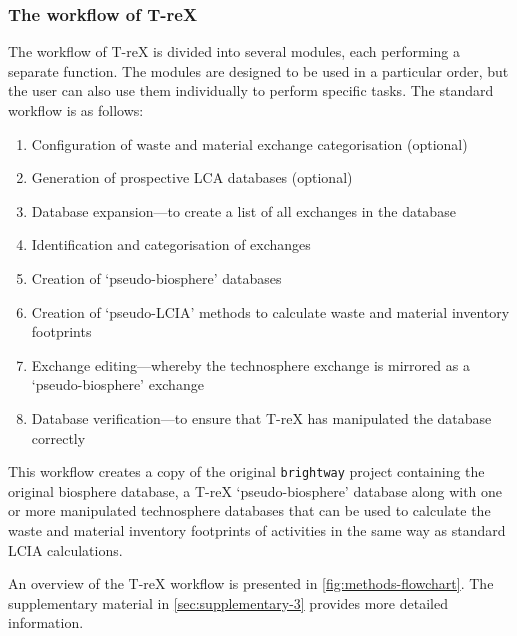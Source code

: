 \documentclass[a4paper,fleqn]{cas-dc}
\begin{document}
\subsubsection{The workflow of T-reX}

The workflow of T-reX is divided into several modules, each performing a
separate function. The modules are designed to be used in a particular order,
but the user can also use them individually to perform specific tasks. The
standard workflow is as follows:

\begin{enumerate}
	\item Configuration of waste and material exchange categorisation (optional)
	\item Generation of prospective LCA databases (optional)
	\item Database expansion---to create a list of all exchanges in the database
	\item Identification and categorisation of exchanges
	\item Creation of `pseudo-biosphere' databases
	\item Creation of `pseudo-LCIA' methods to calculate waste and material inventory
	      footprints
	\item Exchange editing---whereby the technosphere exchange is mirrored as a
	      `pseudo-biosphere' exchange
	\item Database verification---to ensure that T-reX has manipulated the database
	      correctly
\end{enumerate}

This workflow creates a copy of the original \texttt{brightway} project
containing the original biosphere database, a T-reX `pseudo-biosphere' database
along with one or more manipulated technosphere databases that can be used to
calculate the waste and material inventory footprints of activities in the same
way as standard LCIA calculations.

An overview of the T-reX workflow is presented in
\autoref{fig:methods-flowchart}. The supplementary material in 
\autoref{sec:supplementary-3} provides more detailed  information.
\end{document}

